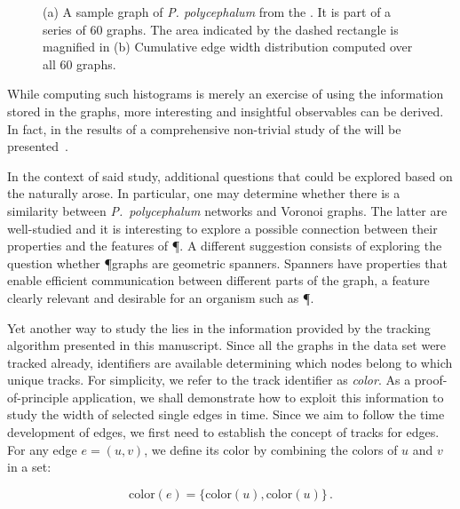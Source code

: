 	\begin{figure}[!htp]
		\centering
		\qquad
		\caption[Demo - Computing an observable across an entire series of graphs]{(a) A sample graph of \emph{P. polycephalum} from the \data. It is part of a series of $60$ graphs. The area indicated by the dashed rectangle is magnified in  (b) Cumulative edge width distribution computed over all $60$ graphs.}
    \end{figure}


	While computing such histograms is merely an exercise of using the information stored in the graphs, more interesting and insightful observables can be derived. In fact, in  the results of a comprehensive non-trivial study of the \data will be presented~\cite{dirnberger2016}.

	In the context of said study, additional questions that could be explored based on the \data naturally arose. In particular, one may determine whether there is a similarity between \emph{P.~polycephalum} networks and Voronoi graphs. The latter are well-studied and it is interesting to explore a possible connection between their properties and the features of \P. A different suggestion consists of exploring the question whether \P graphs are geometric spanners. Spanners have properties that enable efficient communication between different parts of the graph, a feature clearly relevant and desirable for an organism such as \P.

	Yet another way to study the \data lies in the information provided by the tracking algorithm presented in this manuscript.	Since all the graphs in the data set were tracked already, identifiers are available determining which nodes belong to which unique tracks. For simplicity, we refer to the track identifier as \emph{color}. As a proof-of-principle application, we shall demonstrate how to exploit this information to study the width of selected single edges in time. Since we aim to follow the time development of edges, we first need to establish the concept of tracks for edges. For any edge $e = (u,v)$, we define its color by combining the colors of $u$ and $v$ in a set:

	\begin{equation}
		\text{color}(e) = \{\text{color}(u), \text{color}(u)\} \,.
	\end{equation}

